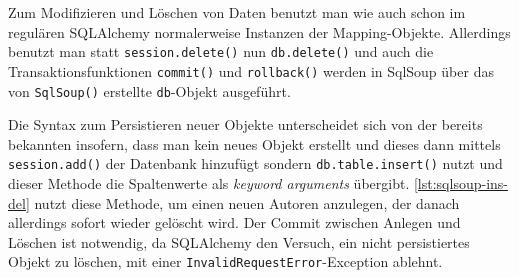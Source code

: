 

Zum Modifizieren und Löschen von Daten benutzt man wie auch schon im regulären
SQLAlchemy normalerweise Instanzen der Mapping-Objekte. Allerdings benutzt man
statt \texttt{session.delete()} nun \texttt{db.delete()} und auch die
Transaktionsfunktionen \texttt{commit()} und \texttt{rollback()} werden in
SqlSoup über das von \texttt{SqlSoup()} erstellte \texttt{db}-Objekt ausgeführt.

Die Syntax zum Persistieren neuer Objekte unterscheidet sich von der bereits
bekannten insofern, dass man kein neues Objekt erstellt und dieses dann mittels
\texttt{session.add()} der Datenbank hinzufügt sondern
\texttt{db.table.insert()} nutzt und dieser Methode die Spaltenwerte als
\textit{keyword arguments} übergibt. \autoref{lst:sqlsoup-ins-del} nutzt diese
Methode, um einen neuen Autoren anzulegen, der danach allerdings sofort wieder
gelöscht wird. Der Commit zwischen Anlegen und Löschen ist notwendig, da
SQLAlchemy den Versuch, ein nicht persistiertes Objekt zu löschen, mit einer
\texttt{InvalidRequestError}-Exception ablehnt.


